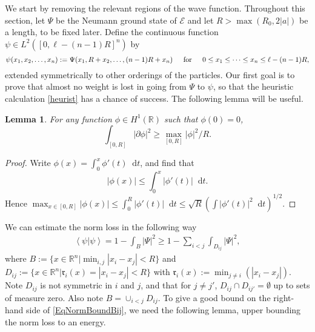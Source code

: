 \documentclass[a4paper,11pt]{article}
\newcommand{\abs}[1]{\left\lvert #1 \right\rvert}
\renewcommand{\braket}[1]{\left\langle#1\right\rangle}
\newcommand*\diff{\mathop{}\!\mathrm{d}}
\newcommand{\R}{\mathbb{R}}
\newtheorem{lemma}[theorem]{Lemma}
\numberwithin{equation}{section}
\begin{document}
	We start by removing the relevant regions of the wave function. Throughout this section, let $ \Psi $ be the Neumann ground state of $\mathcal{E}$ and let $R>\max\left(R_0,2\abs{a}\right)$ be a length, to be fixed later. Define the continuous function $ \psi\in L^2([0,\ell-(n-1)R]^n) $ by
	\begin{equation}
		\label{defpsi}
		\psi(x_1,x_2,\dots,x_n):=\Psi(x_1,R+x_2,\dots,(n-1)R+x_n)\hspace{0.4cm}\text{ for }\hspace{0.4cm}0\leq x_1\leq\dots\leq x_n\leq \ell-(n-1)R, 
	\end{equation}
	extended symmetrically to other orderings of the particles. 
	Our first goal is to prove that almost no weight is lost in going from $\Psi$ to $\psi$, so that the heuristic calculation \eqref{heurist} has a chance of success. The following lemma will be useful.
	\begin{lemma}
		For any function $ \phi\in H^1(\R) $ such that $ \phi(0)=0 $, \begin{equation}\label{EqSobolevIneq}
			\int_{[0,R]}\abs{\partial\phi}^2\geq \max_{[0,R]}\abs{\phi}^2/R.
		\end{equation}
	\end{lemma}
	\begin{proof}
		Write $ \phi(x)=\int_{0}^{x}\phi'(t)\diff t $, and find that \begin{equation}
			\abs{\phi(x)}\leq \int_{0}^{x}\abs{\phi'(t)}\diff t.
		\end{equation}
		Hence $ \max_{x\in[0,R]}\abs{\phi(x)}\leq \int_{0}^{R}\abs{\phi'(t)}\diff t\leq \sqrt{R}\left(\int\abs{\phi'(t)}^2\diff t\right)^{1/2}. $
	\end{proof}
	We can estimate the norm loss in the following way
	\begin{equation}\label{EqNormBoundBij}
		\begin{aligned}
			\braket{\psi|\psi}=1-\int_{B}\abs{\Psi}^2\geq 1-\sum_{i<j}\int_{D_{ij}}\abs{\Psi}^2,
		\end{aligned}
	\end{equation}
	where $ B:=\{x\in\R^n\vert \min_{i,j}\abs{x_i-x_j}<R \} $ and $ D_{ij}:=\{x\in\R^n \vert \mathfrak{r}_i(x)=\abs{x_i-x_j}<R \} $ with $ \mathfrak{r}_i(x):=\min_{j\neq i}(\abs{x_i-x_j}) $. Note $ D_{ij} $ is not symmetric in $ i$ and $j $, and that for $j\neq j'$, $ D_{ij}\cap D_{ij'}=\emptyset$ up to sets of measure zero. Also note $ B=\cup_{i<j}D_{ij} $.  To give a good bound on the right-hand side of \eqref{EqNormBoundBij}, we need the following lemma, upper bounding the norm loss to an energy. 
\end{document}
